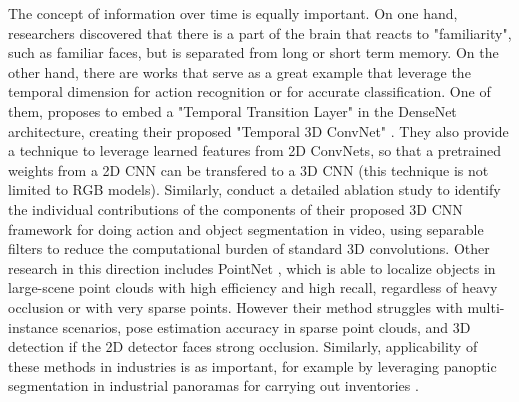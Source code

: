 The concept of information over time is equally important.
On one hand, researchers \cite{wagatsuma2018locus} discovered that there is a part of the brain that reacts to "familiarity", such as familiar faces, but is separated from long or short term memory.
On the other hand, there are works \cite{simonyan2014two} that serve as a great example that leverage the temporal dimension for action recognition or for accurate classification. One of them, proposes to embed a "Temporal Transition Layer" in the DenseNet architecture, creating their proposed "Temporal 3D ConvNet" \cite{diba2017temporal}. They also provide a technique to leverage learned features from 2D ConvNets, so that a pretrained weights from a 2D CNN can be transfered to a 3D CNN (this technique is not limited to RGB models).
Similarly, \textcite{hou2019efficient} conduct a detailed ablation study to identify the individual contributions of the components of their proposed 3D CNN framework for doing action and object segmentation in video, using separable filters to reduce the computational burden of standard 3D convolutions. 
%
Other research in this direction includes PointNet \cite{qi2018frustum, qi2017pointnet, qi2017pointnet++}, which is able to localize objects in large-scene point clouds with high efficiency and high recall, regardless of heavy occlusion or with very sparse points. However their method struggles with multi-instance scenarios, pose estimation accuracy in sparse point clouds, and 3D detection if the 2D detector faces strong occlusion. 
%
Similarly, applicability of these methods in industries is as important, for example by leveraging panoptic segmentation in industrial panoramas for carrying out inventories \cite{nivaggioli2019using}.
%
